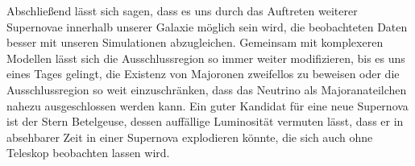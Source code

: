Abschließend lässt sich sagen, dass es uns durch das Auftreten weiterer Supernovae innerhalb unserer Galaxie möglich sein wird, die beobachteten Daten besser mit unseren Simulationen abzugleichen.
Gemeinsam mit komplexeren Modellen lässt sich die Ausschlussregion so immer weiter modifizieren, bis es uns eines Tages gelingt, die Existenz von Majoronen zweifellos zu beweisen oder die
Ausschlussregion so weit einzuschränken, dass das Neutrino als Majoranateilchen nahezu ausgeschlossen werden kann.
Ein guter Kandidat für eine neue Supernova ist der Stern Betelgeuse, dessen auffällige Luminosität vermuten lässt, dass er in absehbarer Zeit in einer Supernova explodieren könnte, die sich auch ohne Teleskop beobachten lassen wird.




